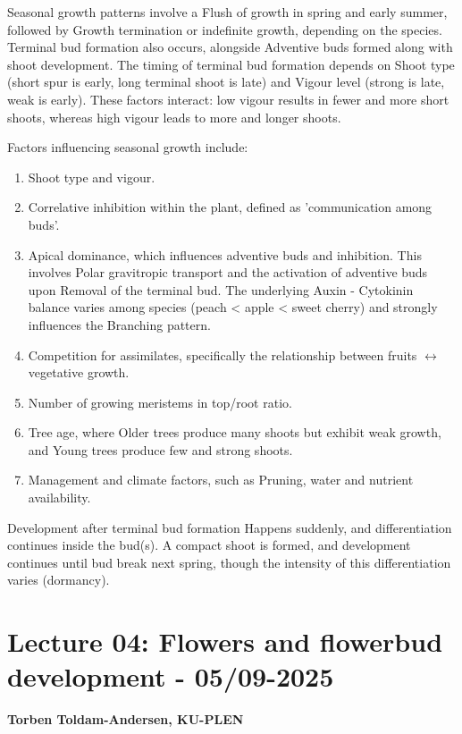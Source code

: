 \vspace{0.5em}
Seasonal growth patterns involve a Flush of growth in spring and early summer, followed by Growth termination or indefinite growth, depending on the species. Terminal bud formation also occurs, alongside Adventive buds formed along with shoot development. The timing of terminal bud formation depends on Shoot type (short spur is early, long terminal shoot is late) and Vigour level (strong is late, weak is early). These factors interact: low vigour results in fewer and more short shoots, whereas high vigour leads to more and longer shoots.

\vspace{0.5em}
Factors influencing seasonal growth include: 

\begin{enumerate} 
    \item Shoot type and vigour. 
    \item Correlative inhibition within the plant, defined as 'communication among buds'. 
    \item Apical dominance, which influences adventive buds and inhibition. This involves Polar gravitropic transport and the activation of adventive buds upon Removal of the terminal bud. The underlying Auxin - Cytokinin balance varies among species (peach < apple < sweet cherry) and strongly influences the Branching pattern. 
    \item Competition for assimilates, specifically the relationship between fruits $\leftrightarrow$ vegetative growth. 
    \item Number of growing meristems in top/root ratio. 
    \item Tree age, where Older trees produce many shoots but exhibit weak growth, and Young trees produce few and strong shoots. 
    \item Management and climate factors, such as Pruning, water and nutrient availability. 
\end{enumerate} 

\vspace{0.5em}
Development after terminal bud formation Happens suddenly, and differentiation continues inside the bud(s). A compact shoot is formed, and development continues until bud break next spring, though the intensity of this differentiation varies (dormancy).

\section{Lecture 04: Flowers and flowerbud development - 05/09-2025}
\textbf{Torben Toldam-Andersen, KU-PLEN}

